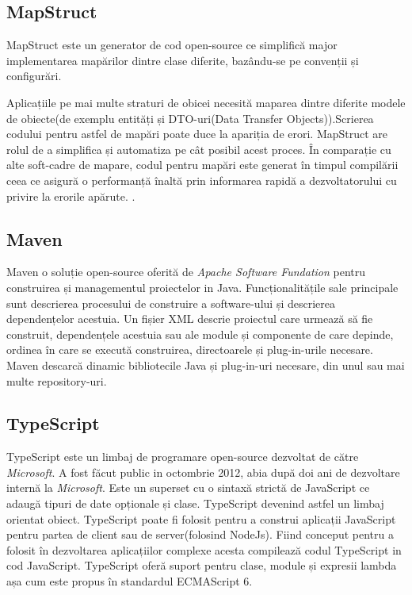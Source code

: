     \subsection{MapStruct}
MapStruct este un generator de cod open-source ce simplifică major implementarea mapărilor dintre clase diferite, bazându-se pe convenții și configurări.

Aplicațiile pe mai multe straturi de obicei necesită maparea dintre diferite modele de obiecte(de exemplu
entități și DTO-uri(Data Transfer Objects)).Scrierea codului pentru astfel de mapări poate duce la apariția de erori.
MapStruct are rolul de a simplifica și automatiza pe cât posibil acest proces. În comparație cu alte
soft-cadre de mapare, codul pentru mapări este generat în timpul compilării ceea ce asigură o performanță
înaltă prin informarea rapidă a dezvoltatorului cu privire la erorile apărute.
\cite{MapStruct}.
    \subsection{Maven}
Maven o soluție open-source oferită de \textit{Apache Software Fundation}
 pentru construirea și managementul proiectelor in Java. 
 Funcționalitățile sale principale sunt descrierea procesului de construire a software-ului și descrierea dependențelor 
 acestuia. Un fișier XML descrie proiectul care urmează să fie construit, dependențele acestuia sau ale module și 
 componente de care depinde, ordinea în care se execută construirea, directoarele și plug-in-urile necesare. Maven descarcă 
 dinamic bibliotecile Java și plug-in-uri necesare, din unul sau mai multe repository-uri\cite{Maven}.
    \subsection{TypeScript}
    TypeScript este un limbaj de programare open-source dezvoltat de către \textit{Microsoft}. A fost făcut public in octombrie 2012,
 abia după doi ani de dezvoltare internă la \textit{Microsoft}. Este un superset cu o sintaxă 
strictă de JavaScript ce adaugă tipuri de date opționale și clase. TypeScript devenind astfel un limbaj orientat obiect.
    TypeScript poate fi folosit pentru a construi aplicații JavaScript pentru partea de client sau de server(folosind NodeJs). Fiind 
conceput pentru a folosit în dezvoltarea aplicațiilor complexe acesta compilează codul TypeScript in cod JavaScript. TypeScript oferă suport pentru
clase, module și expresii lambda așa cum este propus în standardul ECMAScript 6\cite{TypeScript}.

